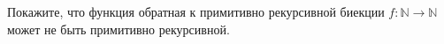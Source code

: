 Покажите, что функция обратная к примитивно рекурсивной биекции $f\colon \mathbb{N} \to \mathbb{N}$ может
не быть примитивно рекурсивной.
